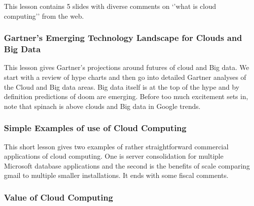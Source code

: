 This lesson contains 5 slides with diverse comments on `'what is cloud
computing'' from the web.






\subsubsection{Gartner's Emerging Technology Landscape for Clouds and
  Big Data}\label{gartners-emerging-technology-landscape-for-clouds-and-big-data}

This lesson gives Gartner's projections around futures of cloud and Big
data. We start with a review of hype charts and then go into detailed
Gartner analyses of the Cloud and Big data areas. Big data itself is at
the top of the hype and by definition predictions of doom are emerging.
Before too much excitement sets in, note that spinach is above clouds
and Big data in Google trends.



\subsubsection{Simple Examples of use of Cloud Computing}

This short lesson gives two examples of rather straightforward
commercial applications of cloud computing. One is server consolidation
for multiple Microsoft database applications and the second is the
benefits of scale comparing gmail to multiple smaller installations. It
ends with some fiscal comments.



\subsubsection{Value of Cloud Computing}\label{value-of-cloud-computing}

